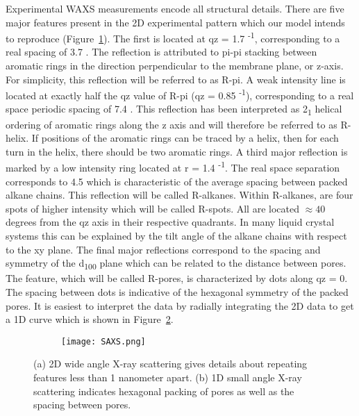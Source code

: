 Experimental WAXS measurements encode all structural details. 
There are five major features present in the 2D experimental pattern which
our model intends to reproduce (Figure~\ref{fig:WAXS}). The first is located
at qz = 1.7 \angstrom \textsuperscript{-1}, corresponding to a real spacing 
of 3.7 \angstrom. The reflection is attributed to pi-pi stacking
between aromatic rings in the direction perpendicular to the membrane plane, or z-axis. 
For simplicity, this reflection will be referred to as R-pi. A weak intensity
line is located at exactly half the qz value of R-pi (qz = 0.85 \angstrom \textsuperscript{-1}), corresponding to a 
real space periodic spacing of 7.4 \angstrom. This reflection has been 
interpreted  as 2\textsubscript{1} helical ordering of aromatic rings along the
z axis and will therefore be referred to as R-helix. If positions of the 
aromatic rings can be traced by a helix, then for each turn in the helix, 
there should be two aromatic rings. A third major reflection is marked by 
a low intensity ring located at r = 1.4 \angstrom \textsuperscript{-1}. The
real space separation corresponds to 4.5 \angstrom which is characteristic
of the average spacing between packed alkane chains. This reflection will be
called R-alkanes. Within R-alkanes, are four spots of higher intensity which 
will be called R-spots. All are located $\approx 40$ degrees from the qz axis
in their respective quadrants. In many liquid crystal systems this can be
explained by the tilt angle of the alkane chains with respect to the xy plane. 
The final major reflections correspond to the spacing and symmetry of the d\textsubscript{100} 
plane which can be related to the distance between pores. The feature, which 
will be called R-pores, is characterized by dots along qz = 0. The spacing
between dots is indicative of the hexagonal symmetry of the packed pores. It
is easiest to interpret the data by radially integrating the 2D data to get 
a 1D curve which is shown in Figure~\ref{fig:SAXS}.

\begin{figure}[ht]
	\centering
	\begin{subfigure}[t]{0.47\linewidth}
		\centering
		\caption{}\label{fig:WAXS}
	\end{subfigure}
	\begin{subfigure}[t]{0.43\linewidth}
		\centering
		\texttt{[image: SAXS.png]}
		\caption{}\label{fig:SAXS}
	\end{subfigure}
	\caption{(a) 2D wide angle X-ray scattering gives details about repeating features less than 1 nanometer apart. (b) 1D small angle X-ray scattering indicates hexagonal packing of pores as well as the spacing between pores.}\label{fig:SWAXS}
\end{figure}

